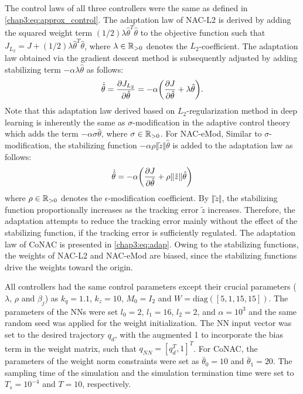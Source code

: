 The control laws of all three controllers were the same as defined in \eqref{chap3:eq:approx_control}.
The adaptation law of NAC-L2 is derived by adding the squared weight term $(1/2)\lambda\hat\theta^T\hat\theta$ to the objective function such that $J_{L_2} = J+(1/2)\lambda\hat\theta^T\hat\theta$, where $\lambda\in\mathbb{R}_{>0}$ denotes the $L_2$-coefficient.
The adaptation law obtained via the gradient descent method is subsequently adjusted by adding stabilizing term $-\alpha\lambda\hat\theta$ as follows:
\begin{equation} 
    \dot{\hat\theta} = 
    {\partial J_{L_2}\over\partial \hat\theta}
    =-\alpha
    \bigg(
        {\partial J\over\partial \hat\theta}+\lambda\hat\theta
    \bigg)
    .
    \label{chap3:eq:adap_L2}
\end{equation}
Note that this adaptation law derived based on $L_2$-regularization method in deep learning is inherently the same as $\sigma$-modification in the adaptive control theory which adds the term $-\alpha\sigma\hat\theta$, where $\sigma\in\mathbb{R}_{>0}$.
For NAC-eMod, Similar to $\sigma$-modification, the stabilizing function $-\alpha\rho\Vert \tilde z \Vert\hat\theta$ is added to the adaptation law as follows:
\begin{equation}
    \dot{\hat\theta} = -\alpha
    \bigg(
        {\partial J\over\partial \hat\theta}+\rho\Vert\tilde z\Vert\hat\theta
    \bigg)
    \label{chap3:eq:adap_eMod}
\end{equation}
where $\rho\in\mathbb{R}_{>0}$ denotes the $\epsilon$-modification coefficient.
By $\Vert\tilde z\Vert$, the stabilizing function proportionally increases as the tracking error $\tilde z$ increases.
Therefore, the adaptation attempts to reduce the tracking error mainly without the effect of the stabilizing function, if the tracking error is sufficiently regulated.
The adaptation law of CoNAC is presented in \eqref{chap3:eq:adap}.
Owing to the stabilizing functions, the weights of NAC-L2 and NAC-eMod are biased, since the stabilizing functions drive the weights toward the origin.

All controllers had the same control parameters except their crucial parameters (\ie $\lambda$, $\rho$ and $\beta_j$) as $k_q=1.1$, $k_z=10$, $M_0=I_2$ and $W=\text{diag}([5,1,15,15])$.
The parameters of the NNs were set $l_0=2$, $l_1=16$, $l_2=2$, and $\alpha=10^3$ and the same random seed was applied for the weight initialization.
The NN input vector was set to the desired trajectory $q_d$, with the augmented 1 to incorporate the bias term in the weight matrix, such that $q_{NN}=[q_d^T,1]^T$. 
For CoNAC, the parameters of the weight norm constraints were set as $\bar\theta_0=10$ and $\bar\theta_1=20$.
The sampling time of the simulation and the simulation termination time were set to $T_s=10^{-4}$ and $T=10$, respectively.

